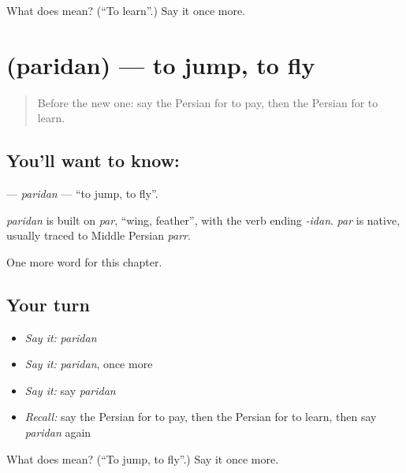\begin{tcolorbox}[breakable,colback=teal!4,colframe=teal!35!black,title={Before you move on}]
What does  mean? (\textquotedblleft{}To learn\textquotedblright{}.) Say it once more.
\end{tcolorbox}
\section[\texorpdfstring{\fa{پریدن} (paridan)}{پریدن (paridan)}]{ (paridan) — to jump, to fly}

\label{lesson:FA-C131-paridan}



\begin{quote}
Before the new one: say the Persian for to pay, then the Persian for to learn.
\end{quote}

\subsection*{You'll want to know: }
\textbf{} — \emph{paridan} — \textquotedblleft{}to jump, to fly\textquotedblright{}.

\begin{cousinweb}
\emph{paridan} is built on \emph{par}, \textquotedblleft{}wing, feather\textquotedblright{}, with the verb ending \emph{-idan}. \emph{par} is native, usually traced to Middle Persian \emph{parr}.
\end{cousinweb}

\begin{grammarlens}[title={What you've built}]
One more word for this chapter.
\end{grammarlens}

\subsection*{Your turn}
\begin{itemize}
\raggedright
  \item \emph{Say it:} \emph{paridan}
  \item \emph{Say it:} \emph{paridan}, once more
  \item \emph{Say it:} say \emph{paridan}
  \item \emph{Recall:} say the Persian for to pay, then the Persian for to learn, then say \emph{paridan} again
\end{itemize}

\begin{tcolorbox}[breakable,colback=teal!4,colframe=teal!35!black,title={Before you move on}]
What does  mean? (\textquotedblleft{}To jump, to fly\textquotedblright{}.) Say it once more.
\end{tcolorbox}
